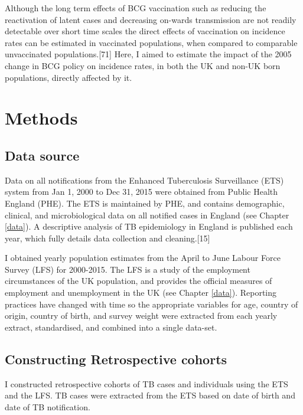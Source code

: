 \documentclass[11pt,twoside]{bristolthesis}
\begin{document}
  Although the long term effects of BCG vaccination such as reducing the reactivation of latent cases and decreasing on-wards transmission are not readily detectable over short time scales the direct effects of vaccination on incidence rates can be estimated in vaccinated populations, when compared to comparable unvaccinated populations.{[}71{]} Here, I aimed to estimate the impact of the 2005 change in BCG policy on incidence rates, in both the UK and non-UK born populations, directly affected by it.
  
  \hypertarget{methods}{%
  \section{Methods}\label{methods}}
  
  \hypertarget{data-source}{%
  \subsection{Data source}\label{data-source}}
  
  Data on all notifications from the Enhanced Tuberculosis Surveillance (ETS) system from Jan 1, 2000 to Dec 31, 2015 were obtained from Public Health England (PHE). The ETS is maintained by PHE, and contains demographic, clinical, and microbiological data on all notified cases in England (see Chapter \ref{data}). A descriptive analysis of TB epidemiology in England is published each year, which fully details data collection and cleaning.{[}15{]}
  
  I obtained yearly population estimates from the April to June Labour Force Survey (LFS) for 2000-2015. The LFS is a study of the employment circumstances of the UK population, and provides the official measures of employment and unemployment in the UK (see Chapter \ref{data}). Reporting practices have changed with time so the appropriate variables for age, country of origin, country of birth, and survey weight were extracted from each yearly extract, standardised, and combined into a single data-set.
  
  \hypertarget{constructing-retrospective-cohorts}{%
  \subsection{Constructing Retrospective cohorts}\label{constructing-retrospective-cohorts}}
  
  I constructed retrospective cohorts of TB cases and individuals using the ETS and the LFS. TB cases were extracted from the ETS based on date of birth and date of TB notification.
  
\end{document}
